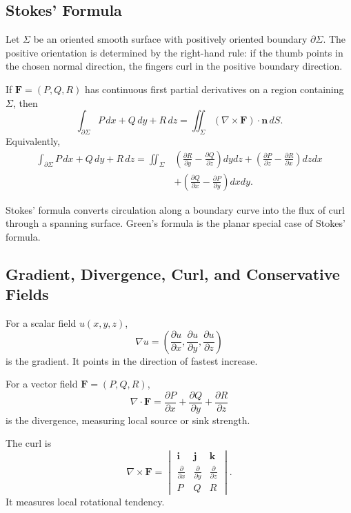 \subsection{Stokes' Formula}

Let $\Sigma$ be an oriented smooth surface with positively oriented boundary $\partial\Sigma$. The positive orientation is determined by the right-hand rule: if the thumb points in the chosen normal direction, the fingers curl in the positive boundary direction.

\begin{theorem}
If $\mathbf F=(P,Q,R)$ has continuous first partial derivatives on a region containing $\Sigma$, then
\[
    \int_{\partial\Sigma}P\,dx+Q\,dy+R\,dz
    =\iint_{\Sigma}(\nabla\times\mathbf F)\cdot\mathbf n\,dS.
\]
Equivalently,
\[
\begin{aligned}
    \int_{\partial\Sigma}P\,dx+Q\,dy+R\,dz
    =\iint_{\Sigma}&
    \left(\frac{\partial R}{\partial y}-\frac{\partial Q}{\partial z}\right)dydz
    +\left(\frac{\partial P}{\partial z}-\frac{\partial R}{\partial x}\right)dzdx \\
    &+\left(\frac{\partial Q}{\partial x}-\frac{\partial P}{\partial y}\right)dxdy.
\end{aligned}
\]
\end{theorem}

Stokes' formula converts circulation along a boundary curve into the flux of curl through a spanning surface. Green's formula is the planar special case of Stokes' formula.

\subsection{Gradient, Divergence, Curl, and Conservative Fields}

For a scalar field $u(x,y,z)$,
\[
    \nabla u=
    \left(\frac{\partial u}{\partial x},
    \frac{\partial u}{\partial y},
    \frac{\partial u}{\partial z}\right)
\]
is the gradient. It points in the direction of fastest increase.

For a vector field $\mathbf F=(P,Q,R)$,
\[
    \nabla\cdot\mathbf F
    =\frac{\partial P}{\partial x}+\frac{\partial Q}{\partial y}+\frac{\partial R}{\partial z}
\]
is the divergence, measuring local source or sink strength.

The curl is
\[
    \nabla\times\mathbf F
    =
    \begin{vmatrix}
        \mathbf i & \mathbf j & \mathbf k\\
        \frac{\partial}{\partial x} & \frac{\partial}{\partial y} & \frac{\partial}{\partial z}\\
        P & Q & R
    \end{vmatrix}.
\]
It measures local rotational tendency.

